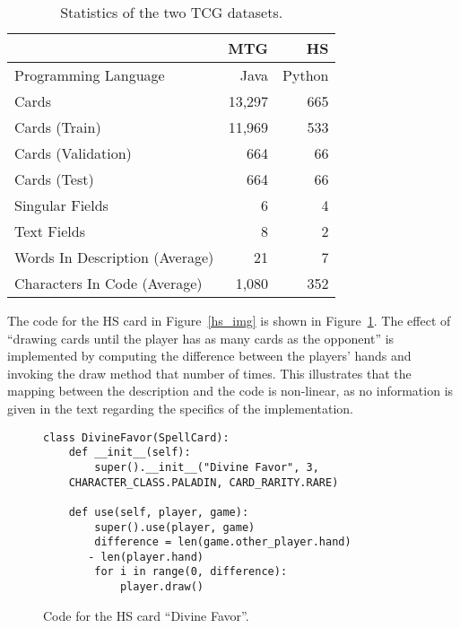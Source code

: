 \documentclass[11pt]{article}
\begin{document}
\begin{table}
\centering
\small
\begin{tabular}{@{}lrr@{}}
\toprule
{\bf } & {\bf MTG} & {\bf HS}\\
\midrule
Programming Language & Java & Python\\
\midrule
Cards & 13,297 & 665 \\
Cards (Train) & 11,969 & 533 \\
Cards (Validation) & 664 & 66 \\
Cards (Test) & 664 & 66 \\
\midrule
Singular Fields & 6 & 4 \\
Text Fields & 8 & 2 \\
\midrule
Words In Description (Average) & 21 & 7 \\
Characters In Code (Average) & 1,080 & 352 \\
\bottomrule
\end{tabular}
\caption{Statistics of the two TCG datasets.}\label{tab:corpus}
\end{table}


The code for the HS card in Figure~\ref{hs_img} is shown in Figure~\ref{df_code}. The effect of ``drawing cards until the player has as many cards as the
opponent'' is implemented by computing the difference between the players' hands
and invoking the draw method that number of times. This illustrates that
the mapping between the description and the code is non-linear, as no information is given in the text regarding the specifics of the implementation.



\begin{figure}[ht!]
\begin{center}
\begin{lstlisting}
class DivineFavor(SpellCard):
    def __init__(self):
        super().__init__("Divine Favor", 3,
    CHARACTER_CLASS.PALADIN, CARD_RARITY.RARE)

    def use(self, player, game):
        super().use(player, game)
        difference = len(game.other_player.hand)
       - len(player.hand)
        for i in range(0, difference):
            player.draw()
\end{lstlisting}
\end{center}
\caption{Code for the HS card ``Divine Favor''.}
\label{df_code}
\end{figure}
\end{document}
